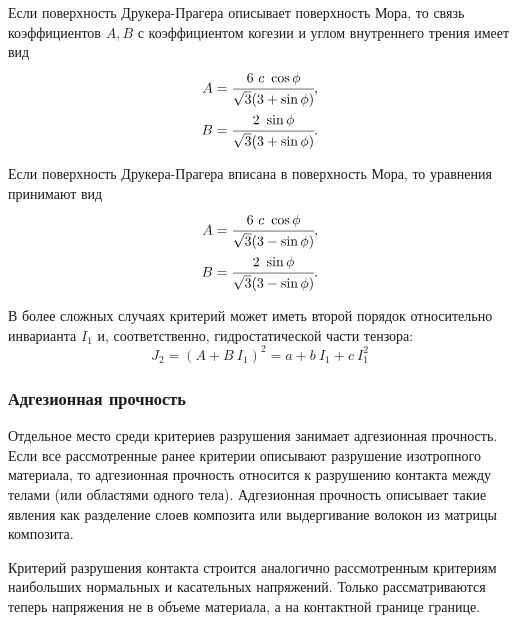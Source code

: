 Если поверхность Друкера-Прагера описывает поверхность Мора, то связь коэффициентов $A, B$ с коэффициентом когезии и углом внутреннего трения имеет вид
\begin{align}
A = \cfrac{6~c~\cos\phi}{\sqrt{3}(3+\sin\phi)}, \nonumber\\
B = \cfrac{2~\sin\phi}{\sqrt{3}(3+\sin\phi)}.
\end{align}

Если поверхность Друкера-Прагера вписана в поверхность Мора, то уравнения принимают вид
\begin{align}
A = \cfrac{6~c~\cos\phi}{\sqrt{3}(3-\sin\phi)}, \nonumber\\
B = \cfrac{2~\sin\phi}{\sqrt{3}(3-\sin\phi)}.
\end{align}

В более сложных случаях критерий может иметь второй порядок относительно инварианта $I_1$ и, соответственно, гидростатической части тензора:
\begin{equation}
J_2 = (A + B~I_1)^2 = a + b~I_1 + c~I_1^2
\end{equation}

\subsubsection{Адгезионная прочность}

Отдельное место среди критериев разрушения занимает адгезионная прочность. Если все рассмотренные ранее критерии описывают разрушение изотропного материала, то адгезионная прочность относится к разрушению контакта между телами (или областями одного тела). Адгезионная прочность описывает такие явления как разделение слоев композита или выдергивание волокон из матрицы композита.

Критерий разрушения контакта строится аналогично рассмотренным критериям наибольших нормальных и касательных напряжений. Только рассматриваются теперь напряжения не в объеме материала, а на контактной границе границе.


